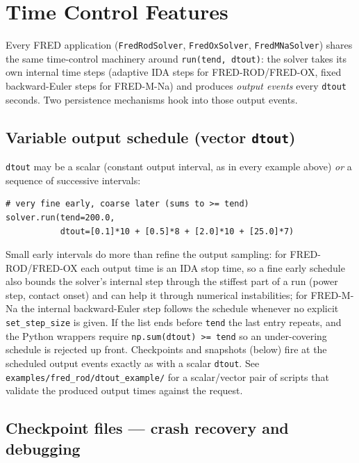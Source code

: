 \documentclass[11pt,a4paper]{article}
\begin{document}
\section{Time Control Features}
\label{sec:time-control}

Every FRED application (\texttt{FredRodSolver}, \texttt{FredOxSolver},
\texttt{FredMNaSolver}) shares the same time-control machinery around
\texttt{run(tend, dtout)}: the solver takes its own internal time steps
(adaptive IDA steps for FRED-ROD/FRED-OX, fixed backward-Euler steps for
FRED-M-Na) and produces \emph{output events} every \texttt{dtout} seconds.
Two persistence mechanisms hook into those output events.

\subsection{Variable output schedule (vector \texttt{dtout})}

\texttt{dtout} may be a scalar (constant output interval, as in every
example above) \emph{or} a sequence of successive intervals:

\begin{lstlisting}
# very fine early, coarse later (sums to >= tend)
solver.run(tend=200.0,
           dtout=[0.1]*10 + [0.5]*8 + [2.0]*10 + [25.0]*7)
\end{lstlisting}

Small early intervals do more than refine the output sampling: for
FRED-ROD/FRED-OX each output time is an IDA stop time, so a fine early
schedule also bounds the solver's internal step through the stiffest part
of a run (power step, contact onset) and can help it through numerical
instabilities; for FRED-M-Na the internal backward-Euler step follows the
schedule whenever no explicit \texttt{set\_step\_size} is given.  If the
list ends before \texttt{tend} the last entry repeats, and the Python
wrappers require \texttt{np.sum(dtout) >= tend} so an under-covering
schedule is rejected up front.  Checkpoints and snapshots (below) fire at
the scheduled output events exactly as with a scalar \texttt{dtout}.  See
\texttt{examples/fred\_rod/dtout\_example/} for a scalar/vector pair of
scripts that validate the produced output times against the request.

\subsection{Checkpoint files --- crash recovery and debugging}
\end{document}
